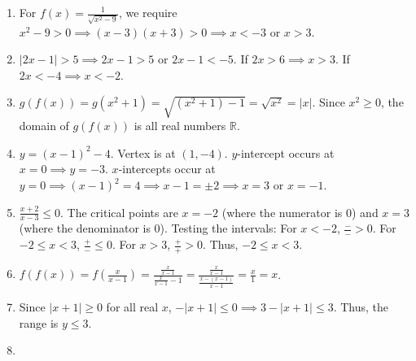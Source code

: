 \documentclass[11pt,a4paper]{article}
\begin{document}
\begin{enumerate}
    \item For $f(x) = \frac{1}{\sqrt{x^2 - 9}}$, we require $x^2 - 9 > 0 \implies (x-3)(x+3) > 0 \implies x < -3$ or $x > 3$.
    \vspace{0.5cm}

    \item $|2x - 1| > 5 \implies 2x - 1 > 5$ or $2x - 1 < -5$.
    If $2x > 6 \implies x > 3$.
    If $2x < -4 \implies x < -2$.
    \vspace{0.5cm}

    \item $g(f(x)) = g(x^2 + 1) = \sqrt{(x^2+1) - 1} = \sqrt{x^2} = |x|$.
    Since $x^2 \ge 0$, the domain of $g(f(x))$ is all real numbers $\mathbb{R}$.
    \vspace{0.5cm}

    \item $y = (x-1)^2 - 4$. Vertex is at $(1, -4)$.
    $y$-intercept occurs at $x=0 \implies y = -3$.
    $x$-intercepts occur at $y=0 \implies (x-1)^2 = 4 \implies x-1 = \pm 2 \implies x = 3$ or $x = -1$.
    \vspace{0.5cm}

    \item $\frac{x+2}{x-3} \le 0$. The critical points are $x = -2$ (where the numerator is 0) and $x = 3$ (where the denominator is 0). Testing the intervals:
    For $x < -2$, $\frac{-}{-} > 0$.
    For $-2 \le x < 3$, $\frac{+}{-} \le 0$.
    For $x > 3$, $\frac{+}{+} > 0$.
    Thus, $-2 \le x < 3$.
    \vspace{0.5cm}

    \item $f(f(x)) = f\left(\frac{x}{x-1}\right) = \frac{\frac{x}{x-1}}{\frac{x}{x-1} - 1} = \frac{\frac{x}{x-1}}{\frac{x - (x-1)}{x-1}} = \frac{x}{1} = x$.
    \vspace{0.5cm}

    \item Since $|x+1| \ge 0$ for all real $x$, $-|x+1| \le 0 \implies 3 - |x+1| \le 3$. Thus, the range is $y \le 3$.
    \vspace{0.5cm}

    \item 
    \vspace{0.5cm}


\end{enumerate}
\end{document}
